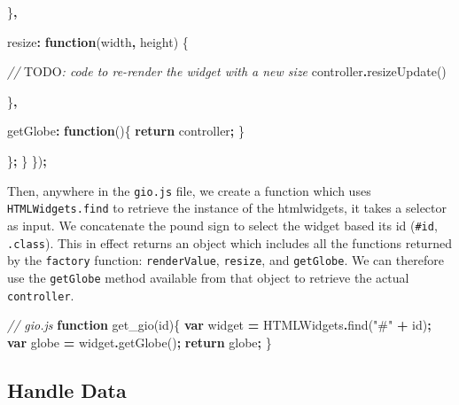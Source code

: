 \documentclass[
]{krantz}
\makeatletter
\newenvironment{Shaded}{\begin{snugshade}}{\end{snugshade}}
\newcommand{\AlertTok}[1]{\textcolor[rgb]{0.33,0.33,0.33}{#1}}
\newcommand{\CommentTok}[1]{\textcolor[rgb]{0.37,0.37,0.37}{\textit{#1}}}
\newcommand{\ControlFlowTok}[1]{\textcolor[rgb]{0.27,0.27,0.27}{\textbf{#1}}}
\newcommand{\DataTypeTok}[1]{\textcolor[rgb]{0.27,0.27,0.27}{#1}}
\newcommand{\FunctionTok}[1]{\textcolor[rgb]{0,0,0}{#1}}
\newcommand{\KeywordTok}[1]{\textcolor[rgb]{0.27,0.27,0.27}{\textbf{#1}}}
\newcommand{\NormalTok}[1]{#1}
\newcommand{\OperatorTok}[1]{\textcolor[rgb]{0.43,0.43,0.43}{\textbf{#1}}}
\newcommand{\StringTok}[1]{\textcolor[rgb]{0.5,0.5,0.5}{#1}}
\newenvironment{kframe}{%
\medskip{}
\setlength{\fboxsep}{.8em}
 \def\at@end@of@kframe{}%
 \ifinner\ifhmode%
  \def\at@end@of@kframe{\end{minipage}}%
  \begin{minipage}{\columnwidth}%
 \fi\fi%
 \def\FrameCommand##1{\hskip\@totalleftmargin \hskip-\fboxsep
 \colorbox{shadecolor}{##1}\hskip-\fboxsep
     \hskip-\linewidth \hskip-\@totalleftmargin \hskip\columnwidth}%
 \MakeFramed {\advance\hsize-\width
   \@totalleftmargin\z@ \linewidth\hsize
   \@setminipage}}%
 {\par\unskip\endMakeFramed%
 \at@end@of@kframe}
\renewenvironment{Shaded}{\begin{kframe}}{\end{kframe}}
\makeatother
\begin{document}
\begin{Shaded}
\begin{Highlighting}[]
\NormalTok{      \}}\OperatorTok{,}

      \DataTypeTok{resize}\OperatorTok{:} \KeywordTok{function}\NormalTok{(width}\OperatorTok{,}\NormalTok{ height) \{}

        \CommentTok{// }\AlertTok{TODO}\CommentTok{: code to re{-}render the widget with a new size}
\NormalTok{        controller}\OperatorTok{.}\FunctionTok{resizeUpdate}\NormalTok{()}

\NormalTok{      \}}\OperatorTok{,}

      \DataTypeTok{getGlobe}\OperatorTok{:} \KeywordTok{function}\NormalTok{()\{}
        \ControlFlowTok{return}\NormalTok{ controller}\OperatorTok{;}
\NormalTok{      \}}

\NormalTok{    \}}\OperatorTok{;}
\NormalTok{  \}}
\NormalTok{\})}\OperatorTok{;}
\end{Highlighting}
\end{Shaded}

Then, anywhere in the \texttt{gio.js} file, we create a function which uses \texttt{HTMLWidgets.find} to retrieve the instance of the htmlwidgets, it takes a selector as input. We concatenate the pound sign to select the widget based its id (\texttt{\#id}, \texttt{.class}). This in effect returns an object which includes all the functions returned by the \texttt{factory} function: \texttt{renderValue}, \texttt{resize}, and \texttt{getGlobe}. We can therefore use the \texttt{getGlobe} method available from that object to retrieve the actual \texttt{controller}.

\begin{Shaded}
\begin{Highlighting}[]
\CommentTok{// gio.js}
\KeywordTok{function} \FunctionTok{get\_gio}\NormalTok{(id)\{}
  \KeywordTok{var}\NormalTok{ widget }\OperatorTok{=}\NormalTok{ HTMLWidgets}\OperatorTok{.}\FunctionTok{find}\NormalTok{(}\StringTok{"\#"} \OperatorTok{+}\NormalTok{ id)}\OperatorTok{;}
  \KeywordTok{var}\NormalTok{ globe }\OperatorTok{=}\NormalTok{ widget}\OperatorTok{.}\FunctionTok{getGlobe}\NormalTok{()}\OperatorTok{;}
  \ControlFlowTok{return}\NormalTok{ globe}\OperatorTok{;}
\NormalTok{\}}
\end{Highlighting}
\end{Shaded}

\hypertarget{shiny-widgets-handle-data}{%
\subsection{Handle Data}\label{shiny-widgets-handle-data}}
\end{document}

